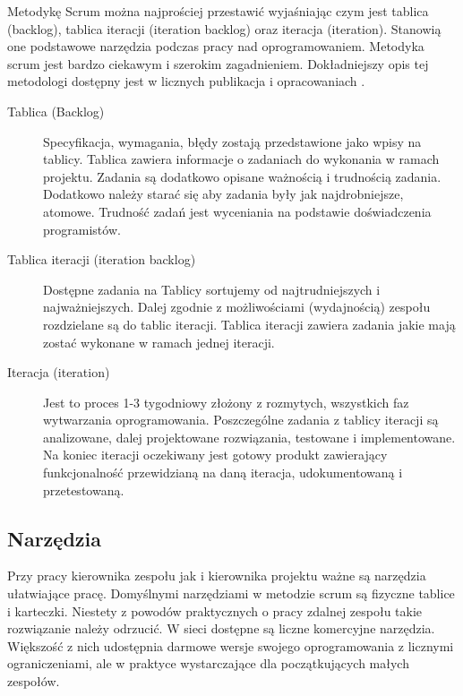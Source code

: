 Metodykę Scrum można najprościej przestawić wyjaśniając czym jest tablica (backlog), tablica iteracji (iteration backlog) oraz iteracja (iteration). Stanowią one podstawowe narzędzia podczas pracy nad oprogramowaniem. Metodyka scrum jest bardzo ciekawym i szerokim zagadnieniem. Dokładniejszy opis tej metodologi dostępny jest w licznych publikacja i opracowaniach \cite{scrumalliance} \cite{scrum_wiki}. 

\begin{description}

\item[Tablica (Backlog)] Specyfikacja, wymagania, błędy zostają przedstawione jako wpisy na tablicy. Tablica zawiera informacje o zadaniach do wykonania w ramach projektu. Zadania są dodatkowo opisane ważnością i trudnością zadania. Dodatkowo należy starać się aby zadania były jak najdrobniejsze, atomowe. Trudność zadań jest wyceniania na podstawie doświadczenia programistów.

\item[Tablica iteracji (iteration backlog)] Dostępne zadania na Tablicy sortujemy od najtrudniejszych i najważniejszych. Dalej zgodnie z możliwościami (wydajnością) zespołu rozdzielane są do tablic iteracji. Tablica iteracji zawiera zadania jakie mają zostać wykonane w ramach jednej iteracji. 

\item[Iteracja (iteration)] Jest to proces 1-3 tygodniowy złożony z rozmytych, wszystkich faz wytwarzania oprogramowania. Poszczególne zadania z tablicy iteracji są analizowane, dalej projektowane rozwiązania, testowane i implementowane. Na koniec iteracji oczekiwany jest gotowy produkt zawierający funkcjonalność przewidzianą na daną iteracja, udokumentowaną i przetestowaną.

\end{description}

\subsection{Narzędzia}

Przy pracy kierownika zespołu jak i kierownika projektu ważne są narzędzia ułatwiające pracę. Domyślnymi narzędziami w metodzie scrum są fizyczne tablice i karteczki. Niestety z powodów praktycznych o pracy zdalnej zespołu takie rozwiązanie należy odrzucić. W sieci dostępne są liczne komercyjne narzędzia. Większość z nich udostępnia darmowe wersje swojego oprogramowania z licznymi ograniczeniami, ale w praktyce wystarczające dla początkujących małych zespołów.  

